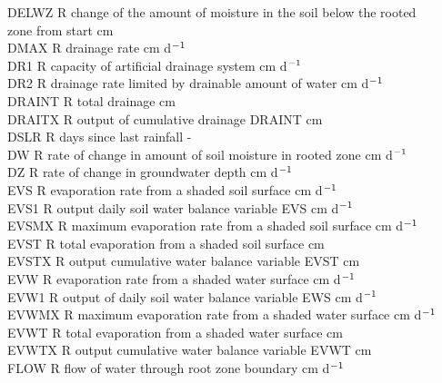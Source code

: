 \begin{tabbing}
DELWZ\> \> R\> change of the amount of moisture in the soil below the rooted \\
\>\> \> zone from start\> \> \> \> \> \> \> cm\\
DMAX\> \> R\> drainage rate\> \> \> \> \> \> \> cm d$^{{\rm -1}}$\\
DR1\> \> R\> capacity of artificial drainage system\> \> \> \> \> \> \> cm d$^{{\rm -1}}$\\
DR2\> \> R\> drainage rate limited by drainable amount of water\> \> \> \> \> \> \> cm d$^{{\rm -1}}$\\
DRAINT\> \> R\> total drainage\> \> \> \> \> \> \> cm\\
DRAITX\> \> R\> output of cumulative drainage DRAINT\> \> \> \> \> \> \> cm\\
DSLR\> \> R\> days since last rainfall\> \> \> \> \> \> \> -\\
DW\> \> R\> rate of change in amount of soil moisture in rooted zone\> \> \> \> \> \> \> cm d$^{{\rm -1}}$\\
DZ\> \> R\> rate of change in groundwater depth\> \> \> \> \> \> \> cm d$^{{\rm -1}}$\\
EVS\> \> R\> evaporation rate from a shaded soil surface\> \> \> \> \> \> \> cm d$^{{\rm -1}}$\\
EVS1\> \> R\> output daily soil water balance variable EVS\> \> \> \> \> \> \> cm d$^{{\rm -1}}$\\
EVSMX\> \> R\> maximum evaporation rate from a shaded soil surface\> \> \> \> \> \> \> cm d$^{{\rm -1}}$\\
EVST\> \> R\> total evaporation from a shaded soil surface\> \> \> \> \> \> \> cm\\
EVSTX\> \> R\> output cumulative water balance variable EVST\> \> \> \> \> \> \> cm\\
EVW\> \> R\> evaporation rate from a shaded water surface\> \> \> \> \> \> \> cm d$^{{\rm -1}}$\\
EVW1\> \> R\> output of daily soil water balance variable EWS\> \> \> \> \> \> \> cm d$^{{\rm -1}}$\\
EVWMX\> \> R\> maximum evaporation rate from a shaded water surface\> \> \> \> \> \> \> cm d$^{{\rm -1}}$\\
EVWT\> \> R\> total evaporation from a shaded water surface\> \> \> \> \> \> \> cm\\
EVWTX\> \> R\> output cumulative water balance variable EVWT\> \> \> \> \> \> \> cm\\
FLOW\> \> R\> flow of water through root zone boundary\> \> \> \> \> \> \> cm d$^{{\rm -1}}$\\

\end{tabbing}
